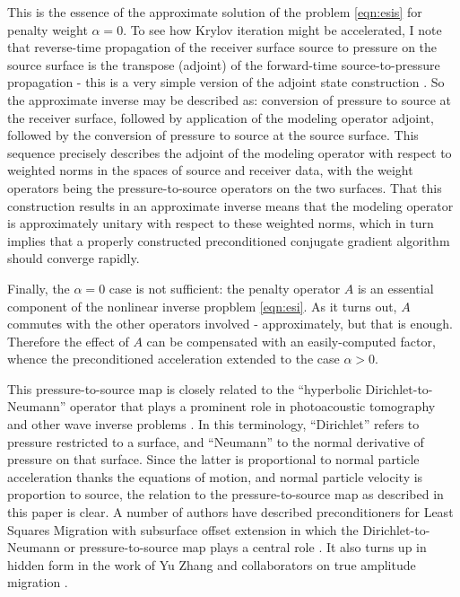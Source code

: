 \documentclass[georeport,12pt]{geophysics}
\begin{document}
This is the essence of the approximate solution of the problem
\ref{eqn:esis} for penalty weight $\alpha=0$. To see how Krylov
iteration might be accelerated, I note that reverse-time propagation of
the receiver surface source to pressure on the source surface is the transpose (adjoint) of the
forward-time source-to-pressure propagation - this is a very simple
version of the adjoint state construction \cite[]{Plessix:06}. So the
approximate inverse may be described as: conversion of pressure to source at the
receiver surface, followed by application of the modeling operator adjoint,
followed by the conversion of pressure to source at the source
surface. This sequence precisely describes the adjoint of the modeling
operator with respect to weighted norms in the spaces of source and
receiver data, with the weight operators being the
pressure-to-source operators on the two surfaces. That this construction results in an
approximate inverse means that the modeling operator is approximately
unitary with respect to these weighted norms, which in turn implies
that a properly constructed preconditioned conjugate gradient algorithm should converge
rapidly.

Finally, the $\alpha=0$ case is not sufficient: the penalty operator
$A$ is an essential component of the nonlinear inverse propblem
\ref{eqn:esi}. As it turns out, $A$ commutes with the other operators
involved - approximately, but that is enough. Therefore the effect of
$A$ can be compensated with an easily-computed factor, whence the
preconditioned acceleration extended to the case $\alpha > 0$. 

This pressure-to-source map is closely related to the ``hyperbolic
Dirichlet-to-Neumann'' operator that plays a prominent role in
photoacoustic tomography and other wave inverse problems
\cite[]{Rachele:00,StefUhl:05}. In this terminology, ``Dirichlet''
refers to pressure restricted to a surface, and ``Neumann'' to the
normal derivative of pressure on that surface. Since the latter is
proportional to normal particle acceleration thanks the equations of motion,
and normal particle velocity is proportion to source, the relation to the
pressure-to-source map as described in this paper is clear. A number
of authors have described preconditioners for Least Squares Migration
with subsurface offset extension in which the Dirichlet-to-Neumann or
pressure-to-source map plays a central role
\cite[]{tenKroode:12,HouSymes:15,Herve2017}. It also turns up in hidden
form in the work of Yu Zhang and collaborators on true amplitude
migration
\cite[]{YuZhang:14,TangXuZhang:13,XuWang:2012,XuZhangTang:11,Zhang:SEG09}.
\end{document}
